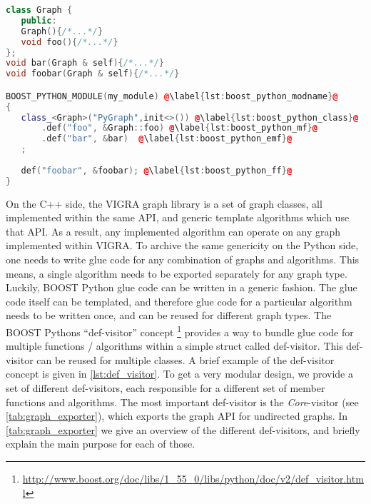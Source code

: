 \vspace{0.3cm}
\begin{lstlisting}[language=c++]
class Graph {
   public:
   Graph(){/*...*/}
   void foo(){/*...*/}
};
void bar(Graph & self){/*...*/}
void foobar(Graph & self){/*...*/}

BOOST_PYTHON_MODULE(my_module) @\label{lst:boost_python_modname}@
{   
   class_<Graph>("PyGraph",init<>()) @\label{lst:boost_python_class}@
       .def("foo", &Graph::foo) @\label{lst:boost_python_mf}@
       .def("bar", &bar)  @\label{lst:boost_python_emf}@
   ;                                      
   
   def("foobar", &foobar); @\label{lst:boost_python_ff}@
}
\end{lstlisting}
\vspace{-1.4cm}

On the C++ side, the VIGRA graph library is a set of graph classes,
all implemented within the same API,
and generic template algorithms which use that API.
As a result, any implemented algorithm can operate on any graph
implemented within VIGRA.
To archive the same genericity on the Python side, one
needs to write glue code for any combination of graphs and algorithms.
This means, a single algorithm needs to be exported separately for any
graph type. 
Luckily, BOOST Python glue code can be written in a generic fashion.
The glue code itself can be templated, and therefore 
glue code for a particular algorithm needs to be written once, 
and can be reused for different graph types.
The BOOST Pythons ``def-visitor'' concept \footnote{\url{http://www.boost.org/doc/libs/1_55_0/libs/python/doc/v2/def_visitor.html}}
provides a way to bundle glue code for multiple functions / algorithms within a simple struct called def-visitor.
This def-visitor can be reused for multiple classes.
A brief example of the def-visitor concept is given in \cref{lst:def_visitor}.
To get a very modular design, we provide a set of different def-visitors,
each responsible for a different set of member functions and algorithms.
The most important def-visitor is the \emph{Core}-visitor (see \cref{tab:graph_exporter}),
which exports the graph API for undirected graphs.
In \cref{tab:graph_exporter} we give an overview of 
the different def-visitors, and briefly explain the main purpose
for each of those.

